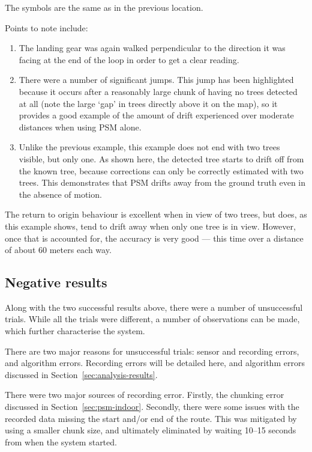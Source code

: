 \documentclass[12pt,oneside,a4paper,draft]{book}
\begin{document}
The symbols are the same as in the previous location.

Points to note include:
\begin{enumerate}[A:]
\item The landing gear was again walked perpendicular to the direction
  it was facing at the end of the loop in order to get a clear
  reading.
\item There were a number of significant jumps. This jump has been
  highlighted because it occurs after a reasonably large chunk of
  having no trees detected at all (note the large `gap' in trees
  directly above it on the map), so it provides a good example of the
  amount of drift experienced over moderate distances when using PSM
  alone.
\item Unlike the previous example, this example does not end with two
  trees visible, but only one. As shown here, the detected tree starts
  to drift off from the known tree, because corrections can only be
  correctly estimated with two trees. This demonstrates that PSM
  drifts away from the ground truth even in the absence of motion.
\end{enumerate}

The return to origin behaviour is excellent when in view of two trees,
but does, as this example shows, tend to drift away when only one tree
is in view. However, once that is accounted for, the accuracy is very
good --- this time over a distance of about 60 meters each way.

\subsection{Negative results}
\label{sec:negative-results}

Along with the two successful results above, there were a number of
unsuccessful trials. While all the trials were different, a number of
observations can be made, which further characterise the system.

There are two major reasons for unsuccessful trials: sensor and
recording errors, and algorithm errors. Recording errors will be
detailed here, and algorithm errors discussed in
Section~\ref{sec:analysis-results}.

There were two major sources of recording error. Firstly, the chunking
error discussed in Section~\ref{sec:psm-indoor}. Secondly, there were some
issues with the recorded data missing the start and/or end of the
route. This was mitigated by using a smaller chunk size, and
ultimately eliminated by waiting 10--15 seconds from when the system
started.
\end{document}
